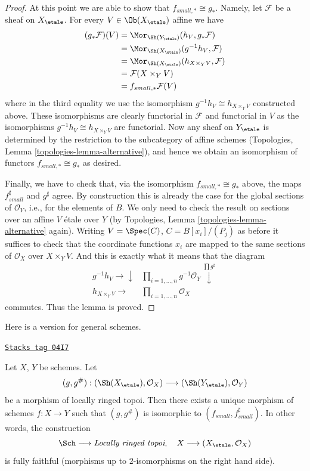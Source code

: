\begin{proof}
\medskip\noindent
At this point we are able to show that $f_{small, *} \cong g_*$.
Namely, let $\mathcal{F}$ be a sheaf on $X_\etale$. For every
$V \in \Ob(X_\etale)$ affine we have
\begin{align*}
(g_*\mathcal{F})(V)
& =
\Mor_{\Sh(Y_\etale)}(h_V, g_*\mathcal{F}) \\
& =
\Mor_{\Sh(X_\etale)}(g^{-1}h_V, \mathcal{F}) \\
& =
\Mor_{\Sh(X_\etale)}(h_{X \times_Y V}, \mathcal{F}) \\
& =
\mathcal{F}(X \times_Y V) \\
& =
f_{small, *}\mathcal{F}(V)
\end{align*}
where in the third equality we use the isomorphism
$g^{-1}h_V \cong h_{X \times_Y V}$ constructed above. These isomorphisms
are clearly functorial in $\mathcal{F}$ and functorial in $V$
as the isomorphisms $g^{-1}h_V \cong h_{X \times_Y V}$ are functorial.
Now any sheaf on $Y_\etale$ is determined by the restriction
to the subcategory of affine schemes
(Topologies, Lemma \ref{topologies-lemma-alternative}),
and hence we obtain an isomorphism of functors $f_{small, *} \cong g_*$
as desired.

\medskip\noindent
Finally, we have to check that, via the isomorphism
$f_{small, *} \cong g_*$ above, the maps $f_{small}^\sharp$ and
$g^\sharp$ agree. By construction this is already the case for the
global sections of $\mathcal{O}_Y$, i.e., for the elements of $B$.
We only need to check the result on
sections over an affine $V$ \'etale over $Y$ (by
Topologies, Lemma \ref{topologies-lemma-alternative}
again). Writing
$V = \Spec(C)$, $C = B[x_i]/(P_j)$ as before it suffices
to check that the coordinate functions $x_i$ are mapped to
the same sections of $\mathcal{O}_X$ over $X \times_Y V$.
And this is exactly what it means that the diagram
$$
\begin{array}{cc}g^{-1}h_V \longrightarrow\downarrow & \prod\nolimits_{i = 1, \ldots, n} g^{-1}\mathcal{O}_Y
\overset{\prod g^\sharp}{\downarrow} \\ h_{X \times_Y V} \longrightarrow & \prod\nolimits_{i = 1, \ldots, n} \mathcal{O}_X\end{array}
$$
commutes. Thus the lemma is proved.
\end{proof}

Here is a version for general schemes.

\begin{theorem}
\label{etale-cohomology-theorem-fully-faithful}
\href{https://stacks.math.columbia.edu/tag/04I7}{\texttt{Stacks tag 04I7}}

Let $X$, $Y$ be schemes. Let
$$
(g, g^\#) :
(\Sh(X_\etale), \mathcal{O}_X)
\longrightarrow
(\Sh(Y_\etale), \mathcal{O}_Y)
$$
be a morphism of locally ringed topoi. Then there exists a
unique morphism of schemes $f : X \to Y$ such that
$(g, g^\#)$ is isomorphic to $(f_{small}, f_{small}^\sharp)$.
In other words, the construction
$$
\Sch \longrightarrow \textit{Locally ringed topoi},
\quad
X \longrightarrow (X_\etale, \mathcal{O}_X)
$$
is fully faithful (morphisms up to $2$-isomorphisms on the right hand side).
\end{theorem}

